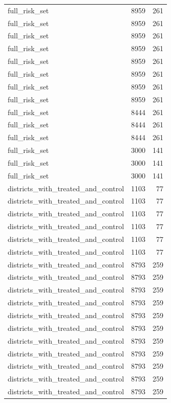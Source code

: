 \begin{table}[!htbp]
\begin{tabular}{lrr}
full\_risk\_set & 8959 & 261 \\
full\_risk\_set & 8959 & 261 \\
full\_risk\_set & 8959 & 261 \\
full\_risk\_set & 8959 & 261 \\
full\_risk\_set & 8959 & 261 \\
full\_risk\_set & 8959 & 261 \\
full\_risk\_set & 8959 & 261 \\
full\_risk\_set & 8959 & 261 \\
full\_risk\_set & 8444 & 261 \\
full\_risk\_set & 8444 & 261 \\
full\_risk\_set & 8444 & 261 \\
full\_risk\_set & 3000 & 141 \\
full\_risk\_set & 3000 & 141 \\
full\_risk\_set & 3000 & 141 \\
districts\_with\_treated\_and\_control & 1103 & 77 \\
districts\_with\_treated\_and\_control & 1103 & 77 \\
districts\_with\_treated\_and\_control & 1103 & 77 \\
districts\_with\_treated\_and\_control & 1103 & 77 \\
districts\_with\_treated\_and\_control & 1103 & 77 \\
districts\_with\_treated\_and\_control & 1103 & 77 \\
districts\_with\_treated\_and\_control & 8793 & 259 \\
districts\_with\_treated\_and\_control & 8793 & 259 \\
districts\_with\_treated\_and\_control & 8793 & 259 \\
districts\_with\_treated\_and\_control & 8793 & 259 \\
districts\_with\_treated\_and\_control & 8793 & 259 \\
districts\_with\_treated\_and\_control & 8793 & 259 \\
districts\_with\_treated\_and\_control & 8793 & 259 \\
districts\_with\_treated\_and\_control & 8793 & 259 \\
districts\_with\_treated\_and\_control & 8793 & 259 \\
districts\_with\_treated\_and\_control & 8793 & 259 \\
districts\_with\_treated\_and\_control & 8793 & 259 \\

\end{tabular}
\end{table}
